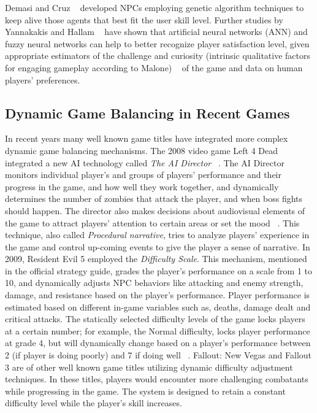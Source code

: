 Demasi and Cruz ~\cite{demasi2003line} developed NPCs employing genetic algorithm techniques to keep alive those agents that best fit the user skill level. Further studies by Yannakakis and Hallam ~\cite{yannakakis2006towards} have shown that artificial neural networks (ANN) and fuzzy neural networks can help to better recognize player satisfaction level, given appropriate estimators of the challenge and curiosity (intrinsic qualitative factors for engaging gameplay according to Malone) ~\cite{malone1982makes} of the game and data on human players' preferences.

\subsection{Dynamic Game Balancing in Recent Games}
In recent years many well known game titles have integrated more complex dynamic game balancing mechanisms. The 2008 video game Left 4 Dead integrated a new AI technology called \textit{The AI Director} ~\cite{left2008dead}. The AI Director monitors individual player's and groups of players' performance and their progress in the game, and how well they work together, and dynamically determines the number of zombies that attack the player, and when boss fights should happen. The director also makes decisions about audiovisual elements of the game to attract players' attention to certain areas or set the mood ~\cite{left4dead2009handson}. This technique, also called \textit{Procedural narrative}, tries to analyze players' experience in the game and control up-coming events to give the player a sense of narrative. In 2009, Resident Evil 5 employed the \textit{Difficulty Scale}. This mechanism, mentioned in the official strategy guide, grades the player's performance on a scale from 1 to 10, and dynamically adjusts NPC behaviors like attacking and enemy strength, damage, and resistance based on the player's performance. Player performance is estimated based on different in-game variables such as, deaths, damage dealt and critical attacks. The statically selected difficulty levels of the game locks players at a certain number; for example, the Normal difficulty, locks player performance at grade 4, but will dynamically change based on a player's performance between 2 (if player is doing poorly) and 7 if doing well ~\cite{resident2009evil}. Fallout: New Vegas and Fallout 3 are of other well known game titles utilizing dynamic difficulty adjustment techniques. In these titles, players would encounter more challenging combatants while progressing in the game. The system is designed to retain a constant difficulty level while the player's skill increases.

